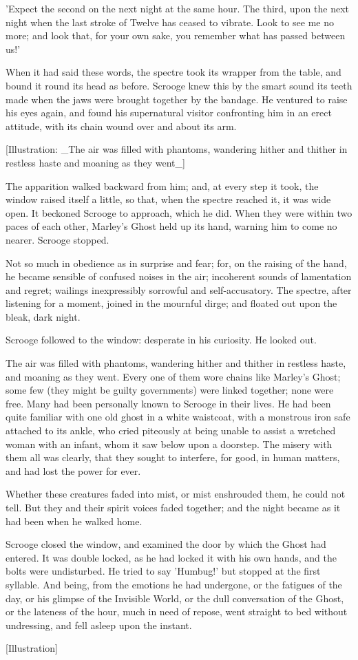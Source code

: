 'Expect the second on the next night at the same hour. The third, upon
the next night when the last stroke of Twelve has ceased to vibrate.
Look to see me no more; and look that, for your own sake, you remember
what has passed between us!'

When it had said these words, the spectre took its wrapper from the
table, and bound it round its head as before. Scrooge knew this by the
smart sound its teeth made when the jaws were brought together by the
bandage. He ventured to raise his eyes again, and found his supernatural
visitor confronting him in an erect attitude, with its chain wound over
and about its arm.

[Illustration: _The air was filled with phantoms, wandering hither and
thither in restless haste and moaning as they went_]

The apparition walked backward from him; and, at every step it took, the
window raised itself a little, so that, when the spectre reached it, it
was wide open. It beckoned Scrooge to approach, which he did. When they
were within two paces of each other, Marley's Ghost held up its hand,
warning him to come no nearer. Scrooge stopped.

Not so much in obedience as in surprise and fear; for, on the raising of
the hand, he became sensible of confused noises in the air; incoherent
sounds of lamentation and regret; wailings inexpressibly sorrowful and
self-accusatory. The spectre, after listening for a moment, joined in
the mournful dirge; and floated out upon the bleak, dark night.

Scrooge followed to the window: desperate in his curiosity. He looked
out.

The air was filled with phantoms, wandering hither and thither in
restless haste, and moaning as they went. Every one of them wore chains
like Marley's Ghost; some few (they might be guilty governments) were
linked together; none were free. Many had been personally known to
Scrooge in their lives. He had been quite familiar with one old ghost in
a white waistcoat, with a monstrous iron safe attached to its ankle, who
cried piteously at being unable to assist a wretched woman with an
infant, whom it saw below upon a doorstep. The misery with them all was
clearly, that they sought to interfere, for good, in human matters, and
had lost the power for ever.

Whether these creatures faded into mist, or mist enshrouded them, he
could not tell. But they and their spirit voices faded together; and
the night became as it had been when he walked home.

Scrooge closed the window, and examined the door by which the Ghost had
entered. It was double locked, as he had locked it with his own hands,
and the bolts were undisturbed. He tried to say 'Humbug!' but stopped at
the first syllable. And being, from the emotions he had undergone, or
the fatigues of the day, or his glimpse of the Invisible World, or the
dull conversation of the Ghost, or the lateness of the hour, much in
need of repose, went straight to bed without undressing, and fell asleep
upon the instant.

[Illustration]